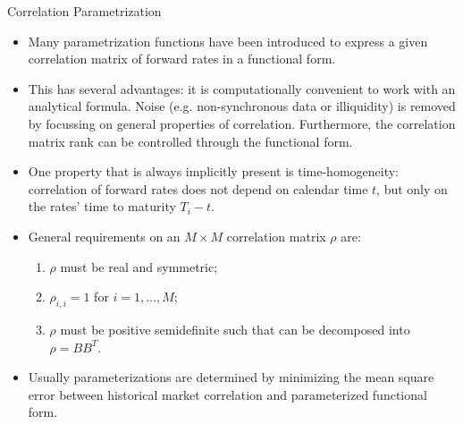 \documentclass{beamer}
\begin{document}
\begin{frame}{Correlation Parametrization}
  \begin{itemize}
  \item Many parametrization functions have been introduced to express a given correlation matrix of forward rates in a functional form. 
  \item This has several advantages: it is computationally convenient to work with an analytical formula. Noise (e.g. non-synchronous data or illiquidity) is removed by focussing on general properties of correlation. Furthermore, the correlation matrix rank can be controlled through the functional form.
  \item One property that is always implicitly present is time-homogeneity: correlation of forward rates does not depend on calendar time $t$, but only on the rates’ time to maturity $T_i-t$.
  \item  General requirements on an $M \times M$ correlation matrix $\rho$ are:
    \begin{enumerate}
    \item $\rho$ must be real and symmetric;
    \item $\rho_{i,i}=1$ for $i = 1,\ldots, M$;
    \item $\rho$ must be positive semidefinite such that can be decomposed into $\rho = BB^T$.
    \end{enumerate}
  \item Usually parameterizations are determined by minimizing the mean square error between historical market correlation and parameterized functional form.
  \end{itemize}
\end{frame}
\end{document}
